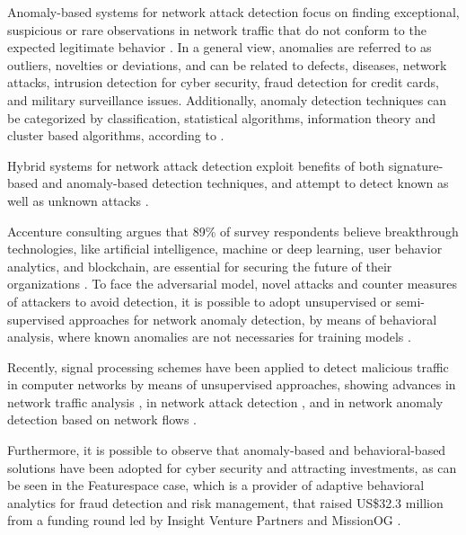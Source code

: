 Anomaly-based systems for network attack detection focus on finding exceptional, suspicious or rare observations in network traffic that do not conform to the expected legitimate behavior \cite{bhuyan2014network}. In a general view, anomalies are referred to as outliers, novelties or deviations, and can be related to defects, diseases, network attacks, intrusion detection for cyber security, fraud detection for credit cards, and military surveillance issues. Additionally, anomaly detection techniques can be categorized by classification, statistical algorithms, information theory and cluster based algorithms, according to \cite{ahmed2016survey}. 

Hybrid systems for network attack detection exploit benefits of both signature-based and anomaly-based detection techniques, and attempt to detect known as well as unknown attacks \cite{ahmed2016survey}.


Accenture consulting argues that 89\% of survey respondents believe breakthrough technologies, like artificial intelligence, machine or deep learning, user behavior analytics, and blockchain, are essential for securing the future of their organizations \cite{Accenture2018}. To face the adversarial model, novel attacks and counter measures of attackers to avoid detection, it is possible to adopt unsupervised or semi-supervised approaches for network anomaly detection, by means of behavioral analysis, where known anomalies are not necessaries for training models \cite{moustafa2019holistic}. 

Recently, signal processing schemes have been applied to detect malicious traffic in computer networks by means of unsupervised approaches, showing advances in network traffic analysis \cite{Zonglin2009}, in network attack detection \cite{callegari2011novel}, and in network anomaly detection based on network flows \cite{Lu2009}. 

Furthermore, it is possible to observe that anomaly-based and behavioral-based solutions have been adopted for cyber security and attracting investments, as can be seen in the Featurespace case, which is a provider of adaptive behavioral analytics for fraud detection and risk management, that raised US\$32.3 million from a funding round led by Insight Venture Partners and MissionOG \cite{Williams2019}.

